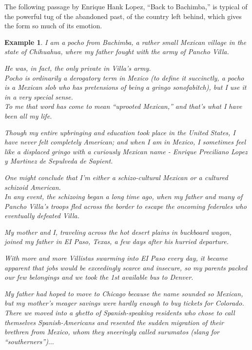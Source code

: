 \documentclass{book}
\numberwithin{equation}{section}
\newtheorem{example}{Example}[chapter]
\begin{document}
The following passage by Enrique Hank Lopez, ``Back to Bachimba,'' is typical of the powerful tug of the abandoned past, of the country left behind, which gives the form so much of its emotion.
\begin{example}
    I am a \textit{pocho} from Bachimba, a rather small Mexican village in the state of Chihuahua, where my father fought with the army of Pancho Villa.
    
    He was, in fact, the only private in Villa's army.
    \\
    
    \textit{Pocho} is ordinarily a derogatory term in Mexico (to define it succinctly, a \textit{pocho} is a Mexican slob who has pretensions of being a gringo sonofabitch), but I use it in a very special sense.
    \\
    
    To me that word has come to mean ``uprooted Mexican,'' and that's what I have been all my life.
    
    Though my entire upbringing and education took place in the United States, I have never felt completely American; and when I am in Mexico, I sometimes feel like a displaced gringo with a curiously Mexican name - Enrique Preciliano Lopez y Martinez de Sepulveda de Sapient.
    
    One might conclude that I'm either a schizo-cultural Mexican or a cultured schizoid American.
    \\
    
    In any event, the schizoing began a long time ago, when my father and many of Pancho Villa's troops fled across the border to escape the oncoming \textit{federales} who eventually defeated Villa.
    
    My mother and I, traveling across the hot desert plains in buckboard wagon, joined my father in EI Paso, Texas, a few days after his hurried departure.
    
    With more and more Villistas swarming into EI Paso every day, it became apparent that jobs would be exceedingly scarce and insecure, so my parents packed our few belongings and we took the 1st available bus to Denver.
    
    My father had hoped to move to Chicago because the name sounded so Mexican, but my mother's meager savings were hardly enough to buy tickets for Colorado.
    \\
    
    There we moved into a ghetto of Spanish-speaking residents who chose to call themselves Spanish-Americans and resented the sudden migration of their brethren from Mexico, whom they sneeringly called \textit{surumatos} (slang for ``southerners'')$\ldots$
    

\end{example}
\end{document}

